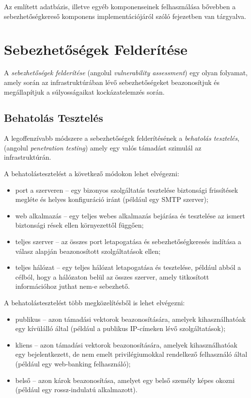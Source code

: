 	Az említett adatbázis, illetve egyéb komponenseinek felhasználása bővebben a sebezhetőségkereső komponens implementációjáról szóló fejezetben van tárgyalva.
	
\section*{Sebezhetőségek Felderítése}
	
	A \textit{sebezhetőségek felderítése} (angolul \textit{vulnerability assessment}) egy olyan folyamat, amely során az infrastruktúrában lévő sebezhetőségeket beazonosítjuk és megállapítjuk a súlyosságaikat kockázatelemzés során.
	
\subsection*{Behatolás Tesztelés}
	
	A legoffenzívabb módszere a sebezhetőségek felderítésének a \textit{behatolás tesztelés}, (angolul \textit{penetration testing}) amely egy valós támadást szimulál az infrastruktúrán.
	
	\noindent A behatolástesztelést a következő módokon lehet elvégezni:
	
	\begin{itemize}
		\item port a szerveren -- egy bizonyos szolgáltatás tesztelése biztonsági frissítések megléte és helyes konfiguráció iránt (például egy SMTP szerver);
		\item web alkalmazás -- egy teljes webes alkalmazás bejárása és tesztelése az ismert biztonsági rések ellen környezettől függően;
		\item teljes szerver -- az összes port letapogatása és sebezhetőségkeresés indítása a válasz alapján beazonosított szolgáltatások ellen;
		\item teljes hálózat -- egy teljes hálózat letapogatása és tesztelése, például abból a célból, hogy a hálózaton belül az összes szerver, amely titkosított információhoz juthat nem-e sebezhető.
	\end{itemize}
	
	\noindent A behatolástesztelést több megközelítésből is lehet elvégezni:
	
	\begin{itemize}
		\item publikus -- azon támadási vektorok beazonosítására, amelyek kihasználhatóak egy kívülálló által (például a publikus IP-címeken lévő szolgáltatások);
		\item kliens -- azon támadási vektorok beazonosítására, amelyek kihasználhatóak egy bejelentkezett, de nem emelt privilégiumokkal rendelkező felhasználó által (például egy web-banking felhasználó);
		\item belső -- azon károk beazonosítása, amelyet egy belső személy képes okozni (például egy rossz-indulatú alkalmazott).
	\end{itemize}

